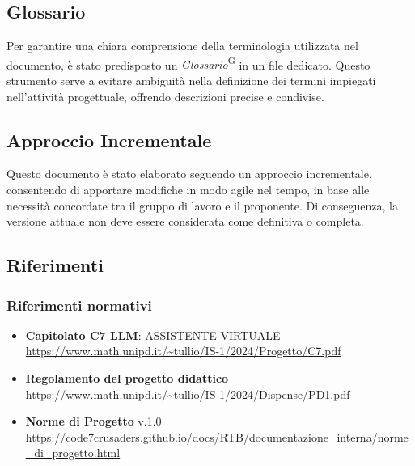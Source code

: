 \subsection{Glossario}
Per garantire una chiara comprensione della terminologia utilizzata nel documento,
è stato predisposto un \href{https://code7crusaders.github.io/docs/RTB/documentazione_interna/glossario.html#glossario}{\emph{Glossario}\textsuperscript{G}} in un file dedicato. Questo strumento 
serve a evitare ambiguità nella definizione dei termini impiegati nell’attività progettuale, 
offrendo descrizioni precise e condivise. 

\subsection{Approccio Incrementale}
Questo documento è stato elaborato seguendo un approccio incrementale, 
consentendo di apportare modifiche in modo agile nel tempo, 
in base alle necessità concordate tra il gruppo di lavoro e il proponente. Di conseguenza, 
la versione attuale non deve essere considerata come definitiva o completa.

\subsection{Riferimenti}
\subsubsection{Riferimenti normativi}
\begin{itemize}
    \item \textbf{Capitolato C7 LLM}: ASSISTENTE VIRTUALE \\ \url{https://www.math.unipd.it/~tullio/IS-1/2024/Progetto/C7.pdf}
    \item \textbf{Regolamento del progetto didattico} \\ \url{https://www.math.unipd.it/~tullio/IS-1/2024/Dispense/PD1.pdf}
    \item \textbf{Norme di Progetto} v.1.0 \\ \url{https://code7crusaders.github.io/docs/RTB/documentazione_interna/norme_di_progetto.html}
\end{itemize}

